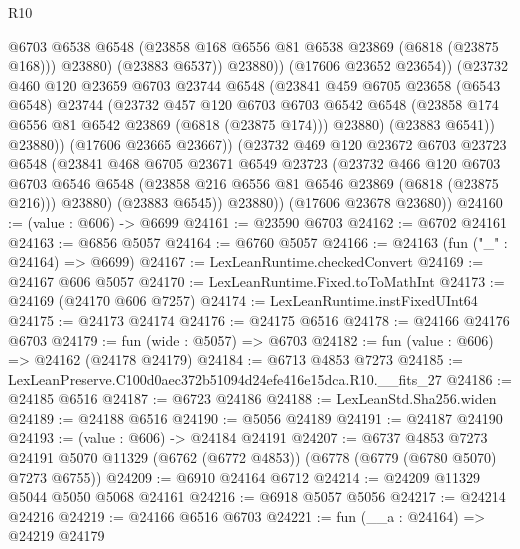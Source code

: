 \begin{lexlean}{R10}
\begin{coremodule}
                      @6703
                      @6538
                      @6548
                      (@23858 @168 @6556 @81 @6538 @23869 (@6818 (@23875 @168)))
                      @23880)
                    (@23883 @6537))
                  @23880))
              (@17606 @23652 @23654))
            (@23732
              @460
              @120
              @23659
              @6703
              @23744
              @6548
              (@23841
                @459
                @6705
                @23658
                (@6543 @6548)
                @23744
                (@23732
                  @457
                  @120
                  @6703
                  @6703
                  @6542
                  @6548
                  (@23858 @174 @6556 @81 @6542 @23869 (@6818 (@23875 @174)))
                  @23880)
                (@23883 @6541))
              @23880))
          (@17606 @23665 @23667))
        (@23732
          @469
          @120
          @23672
          @6703
          @23723
          @6548
          (@23841
            @468
            @6705
            @23671
            @6549
            @23723
            (@23732
              @466
              @120
              @6703
              @6703
              @6546
              @6548
              (@23858 @216 @6556 @81 @6546 @23869 (@6818 (@23875 @216)))
              @23880)
            (@23883 @6545))
          @23880))
      (@17606 @23678 @23680))
@24160 := (value : @606) -> @6699
@24161 := @23590 @6703
@24162 := @6702 @24161
@24163 := @6856 @5057
@24164 := @6760 @5057
@24166 := @24163 (fun ("_" : @24164) => @6699)
@24167 := LexLeanRuntime.checkedConvert
@24169 := @24167 @606 @5057
@24170 := LexLeanRuntime.Fixed.toToMathInt
@24173 := @24169 (@24170 @606 @7257)
@24174 := LexLeanRuntime.instFixedUInt64
@24175 := @24173 @24174
@24176 := @24175 @6516
@24178 := @24166 @24176 @6703
@24179 := fun (wide : @5057) => @6703
@24182 := fun (value : @606) => @24162 (@24178 @24179)
@24184 := @6713 @4853 @7273
@24185 := LexLeanPreserve.C100d0aec372b51094d24efe416e15dca.R10.__fits_27
@24186 := @24185 @6516
@24187 := @6723 @24186
@24188 := LexLeanStd.Sha256.widen
@24189 := @24188 @6516
@24190 := @5056 @24189
@24191 := @24187 @24190
@24193 := (value : @606) -> @24184 @24191
@24207 := @6737
    @4853
    @7273
    @24191
    @5070
    @11329
    (@6762 (@6772 @4853))
    (@6778 (@6779 (@6780 @5070) @7273 @6755))
@24209 := @6910 @24164 @6712
@24214 := @24209 @11329 @5044 @5050 @5068 @24161
@24216 := @6918 @5057 @5056
@24217 := @24214 @24216
@24219 := @24166 @6516 @6703
@24221 := fun (__a : @24164) => @24219 @24179

\end{coremodule}
\end{lexlean}
